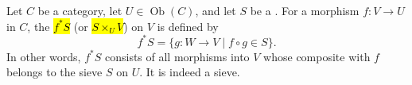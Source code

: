 \begin{definition} \label{definition:pullback_sieve_of_an_object_in_a_category_via_a_morphism_to_the_object}
Let $C$ be a category, let $U \in \operatorname{Ob}(C)$, and let $S$ be a .
For a morphism $f : V \to U$ in $C$, the  \hl{$f^*S$} (or  \hl{$S \times_U V$}) on $V$ is defined by
\[
f^*S = \{ g : W \to V \mid f \circ g \in S \}.
\]
In other words, $f^*S$ consists of all morphisms into $V$ whose composite with $f$ belongs to the sieve $S$ on $U$. It is indeed a sieve.
\end{definition}